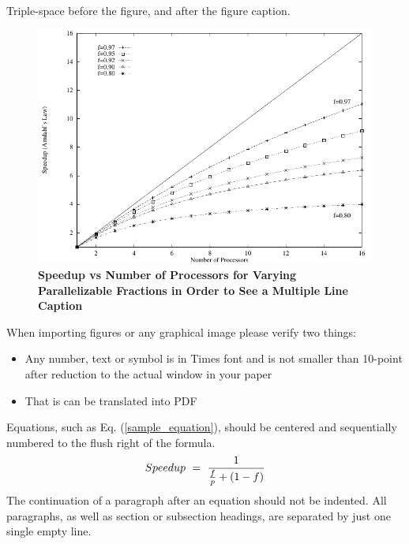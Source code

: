 \documentclass{mc2013}
\begin{document}
Triple-space before the figure, and after the figure caption.

%
\vspace{16pt}
\begin{figure}[!htb]
\begin{spacing}{1.0}
\centering
\includegraphics[scale=0.60]{figure}
\caption{\bf Speedup vs Number of Processors for Varying Parallelizable 
Fractions in Order to See a Multiple Line Caption} 
\label{fig:amdahl}
\end{spacing}
\end{figure}
\vspace{16pt}
%

When importing figures or any graphical image please verify two things:
\begin{itemize}
\item Any number, text or symbol is in Times font and is not smaller than 
    10-point after reduction to the actual window in your paper
\item That is can be translated into PDF
\end{itemize}


Equations, such as Eq. (\ref{sample_equation}), should be centered and 
sequentially numbered to the flush right of the formula.
\begin{equation}
\label{sample_equation}
Speedup\ =\ {1 \over{{f \over {p}} + (1-f)}}
\end{equation}
The continuation of a paragraph after an equation should not be indented.  
All paragraphs, as well as section or subsection headings, are separated by 
just one single empty line.


\end{document}

